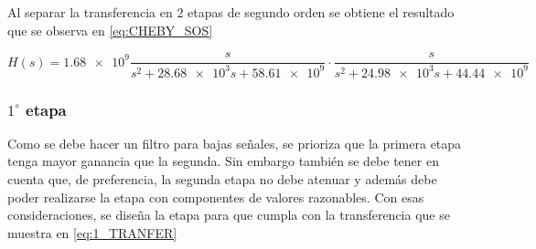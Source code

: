 Al separar la transferencia en 2 etapas de segundo orden se obtiene el resultado que se observa en \ref{eq:CHEBY_SOS}

\begin{equation}
    H(s) = \num{1.68e9}\frac{s}{s^2 + \num{28.68e3}s + \num{58.61e9}}\cdot \frac{s}{s^2 + \num{24.98e3}s + \num{44.44e9}}
    \label{eq:CHEBY_SOS}
\end{equation}

\subsubsection{$1^\circ$ etapa}
Como se debe hacer un filtro para bajas se\~nales, se prioriza que la primera etapa tenga mayor ganancia que la segunda. Sin embargo tambi\'en se debe tener en cuenta que, de preferencia, la segunda etapa no debe atenuar y adem\'as debe poder realizarse la etapa con componentes de valores razonables.
Con esas consideraciones, se dise\~na la etapa para que cumpla con la transferencia que se muestra en \ref{eq:1_TRANFER}

